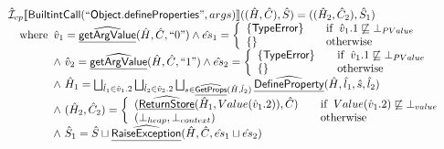 \documentclass{article}
\newcommand{\SF}[1]{\mbox{\textsf{#1}}}
\newcommand{\wherec}[1]{{\rm where}\begin{array}[t]{l}#1\end{array}}
\newcommand{\ifc}[1]{{\rm if}\begin{array}[t]{l}#1\end{array}}
\newcommand{\owc}{{\rm otherwise}}
\newcommand{\aI}{\hat{\mathcal{I}}}
\newcommand{\lbr}{\llbracket}
\newcommand{\rbr}{\rrbracket}
\newcommand{\ahf}[1]{\widehat{\underline{\sf #1}}}
\begin{document}
\[\begin{array}{l}
\aI _{cp}\lbr \SF{BuiltintCall}(``\SF{Object.defineProperties}",args)\rbr((\hat{H},\hat{C}), \hat{S})
  = ((\hat{H}_2, \hat{C}_2), \hat{S}_1)\\
\quad\wherec{
  \hat{v}_1 =\ahf{getArgValue}(\hat{H}, \hat{C}, ``0")
  \land \hat{es}_1 =
    \left\{
    \begin{array}{l@{\quad\quad}l}
      \{ \SF{TypeError} \} & \ifc{\hat{v}_1.1 \not\sqsubseteq \bot_{PValue}}\\
      \{ \}& \owc\\
    \end{array}
    \right.\\
  \land\ \hat{v}_2 =\ahf{getArgValue}(\hat{H}, \hat{C}, ``1")
  \land \hat{es}_2 =
    \left\{
    \begin{array}{l@{\quad\quad}l}
      \{ \SF{TypeError} \} & \ifc{\hat{v}_1.1 \not\sqsubseteq \bot_{PValue}}\\
      \{ \}& \owc\\
    \end{array}
    \right.\\
  \land\ \hat{H}_1 = \bigsqcup_{\hat{l}_1 \in \hat{v}_1.2} \bigsqcup_{\hat{l}_2 \in \hat{v}_2.2}
    \bigsqcup_{s \in \ahf{GetProps}(\hat{H}, \hat{l}_2)}
    \ahf{DefineProperty}(\hat{H}, \hat{l}_1, \hat{s}, \hat{l}_2)\\
  \land\ (\hat{H}_2, \hat{C}_2) = 
    \left\{\begin{array}{l@{\quad\quad}l}
      (\ahf{ReturnStore}(\hat{H}_1, Value(\hat{v}_1.2)), \hat{C})
      & \ifc{Value(\hat{v}_1.2) \not\sqsubseteq \bot_{value}}\\
      (\bot_{heap}, \bot_{context}) & \owc \\
    \end{array}\right.\\
  \land\ \hat{S}_1 = \hat{S} \sqcup \ahf{RaiseException}(\hat{H}, \hat{C}, \hat{es}_1 \sqcup \hat{es}_2)\\
  }\\
\\\\ 



\end{array}
\]
\end{document}
